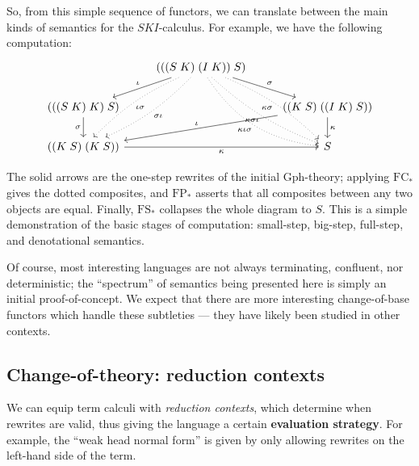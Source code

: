 \documentclass{amsart}
\theoremstyle{definition}
\newcommand{\Gph}{\mathrm{Gph}}
\newcommand{\FC}{\mathrm{FC}}
\newcommand{\FP}{\mathrm{FP}}
\newcommand{\FS}{\mathrm{FS}}
\begin{document}
So, from this simple sequence of functors, we can translate between the main kinds of semantics for the $SKI$-calculus. For example, we have the following computation:
\[\begin{tikzcd}
&	(((S\; K)\; (I\; K))\; S) \arrow[rd,"\sigma"] \arrow[ld,swap,"\iota"] \arrow[ddl,dotted,bend left=10,"\sigma\iota"] \arrow[ddl,dotted,bend right=10,"\iota\sigma"] \arrow[ddr,dotted,swap,bend left=10,"\kappa\sigma"] \arrow[ddr,dotted,bend right=10,swap,"\kappa\sigma\iota"] \arrow[ddr,dotted,swap,bend right=25,"\kappa\iota\sigma"] &\\
(((S\; K)\; K)\; S) \arrow[d,swap,"\sigma"] & & ((K\; S)\; ((I\; K)\; S)) \arrow[lld,swap,"\iota"] \arrow[d,"\kappa"]\\
((K\; S)\; (K\; S)) \arrow[rr,swap,"\kappa"] & & S
\end{tikzcd}\]

The solid arrows are the one-step rewrites of the initial $\Gph$-theory; applying $\FC_*$ gives the dotted composites, and $\FP_*$ asserts that all composites between any two objects are equal. Finally, $\FS_*$ collapses the whole diagram to $S$. This is a simple demonstration of the basic stages of computation: small-step, big-step, full-step, and denotational semantics.

Of course, most interesting languages are not always terminating, confluent, nor deterministic; the ``spectrum'' of semantics being presented here is simply an initial proof-of-concept. We expect that there are more interesting change-of-base functors which handle these subtleties --- they have likely been studied in other contexts.

\subsection{Change-of-theory: reduction contexts}
We can equip term calculi with \textit{reduction contexts}, which determine when rewrites are valid, thus giving the language a certain \textbf{evaluation strategy}. For example, the ``weak head normal form'' is given by only allowing rewrites on the left-hand side of the term.
\end{document}

